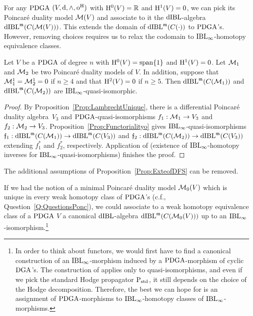 \documentclass[\MainFolder/Text.tex]{subfiles}
\begin{document}
For any $\mathrm{PDGA}$ $(V,\dd,\wedge,\mathrm{o}^{\mathrm{H}})$ with $\mathrm{H}^0(V)=\mathbb{R}$ and $\mathrm{H}^1(V)=0$, we can pick its Poincar\'e duality model $\mathcal{M}(V)$ and associate to it the $\mathrm{dIBL}$-algebra $\mathrm{dIBL}^{\mathfrak{m}}(C(\mathcal{M}(V)))$. This extends the domain of $\mathrm{dIBL}^{\mathfrak{m}}(C(\cdot))$ to $\mathrm{PDGA}$'s. However, removing choices requires us to relax the codomain to $\mathrm{IBL}_\infty$-homotopy equivalence classes.

\begin{Proposition}\label{Prop:ExteofDFS}
Let $V$ be a $\mathrm{PDGA}$ of degree $n$ with $\mathrm{H}^0(V)=\mathrm{span}\{1\}$ and $\mathrm{H}^1(V)=0$.
Let $\mathcal{M}_1$ and $\mathcal{M}_2$ be two Poincar\'e duality models of $V$.
In addition, suppose that $\mathcal{M}_1^1 = \mathcal{M}_2^1 = 0$ if $n\ge 4$ and that $\mathrm{H}^2(V)=0$ if $n\ge 5$.
Then $\mathrm{dIBL}^{\mathfrak{m}}(C(\mathcal{M}_1))$ and $\mathrm{dIBL}^{\mathfrak{m}}(C(\mathcal{M}_2))$ are $\mathrm{IBL}_\infty$-quasi-isomorphic.
\end{Proposition}
\begin{proof}
By Proposition~\ref{Prop:LambrechtUnique}, there is a differential Poincar\'e duality algebra~$V_3$ and $\mathrm{PDGA}$-quasi-isomorphisms $f_1: \mathcal{M}_1\rightarrow V_3$ and $f_2: \mathcal{M}_2\rightarrow V_3$.
Proposition~\ref{Prop:Functorialityo} gives $\mathrm{IBL}_\infty$-quasi-isomorphisms $\mathfrak{f}_1: \mathrm{dIBL}^{\mathfrak{m}}(C(\mathcal{M}_1)) \rightarrow \mathrm{dIBL}^{\mathfrak{m}}(C(V_3))$ and $\mathfrak{f}_2: \mathrm{dIBL}^{\mathfrak{m}}(C(\mathcal{M}_2)) \rightarrow \mathrm{dIBL}^{\mathfrak{m}}(C(V_3))$ extending $f_1^*$ and $f_2^*$, respectively. Application of \cite[Theorem 1.2]{Cieliebak2015} (existence of $\mathrm{IBL}_\infty$-homotopy inverses for $\mathrm{IBL}_\infty$-quasi-isomorphisms) finishes the proof.
\end{proof}

\begin{Conjecture}\label{Conj:UniqModelFollow}
	The additional assumptions of Proposition~\ref{Prop:ExteofDFS} can be removed.
\end{Conjecture}


If we had the notion of a minimal Poincar\'e duality model $\mathcal{M}_0(V)$ which is unique in every weak homotopy class of $\mathrm{PDGA}$'s (c.f., Question~\ref{Q:QuestionsPonc}), we could associate to a weak homotopy equivalence class of a $\mathrm{PDGA}$ $V$ a canonical $\mathrm{dIBL}$-algebra $\mathrm{dIBL}^{\mathfrak{m}}(C(\mathcal{M}_0(V)))$ up to an $\mathrm{IBL}_\infty$-isomorphism.\footnote{In order to think about functors, we would first have to find a canonical construction of an $\mathrm{IBL}_\infty$-morphism induced by a $\mathrm{PDGA}$-morphism of cyclic $\mathrm{DGA}$'s. The construction of \cite[Section~11]{Cieliebak2015} applies only to quasi-isomorphisms, and even if we pick the standard Hodge propagator $\mathrm{P}_{\mathrm{std}}$, it still depends on the choice of the Hodge decomposition. Therefore, the best we can hope for is an assignment of $\mathrm{PDGA}$-morphisms to $\mathrm{IBL}_\infty$-homotopy classes of $\mathrm{IBL}_\infty$-morphisms.}
\end{document}
